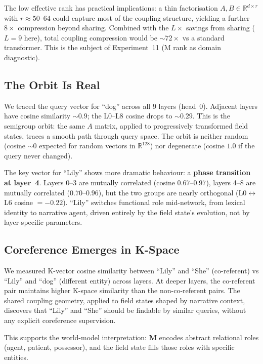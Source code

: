 \documentclass[11pt, a4paper]{article}
\newcommand{\M}{\mathbf{M}}
\newcommand{\R}{\mathbb{R}}
\theoremstyle{remark}
\begin{document}
The low effective rank has practical implications: a thin factorisation $A, B \in \R^{d \times r}$ with $r \approx 50$--$64$ could capture most of the coupling structure, yielding a further $8\times$ compression beyond sharing.
Combined with the $L\times$ savings from sharing ($L{=}9$ here), total coupling compression would be ${\sim}72\times$ vs a standard transformer.
This is the subject of Experiment~11 (M rank as domain diagnostic).

\subsection{The Orbit Is Real}

We traced the query vector for ``dog'' across all 9 layers (head~0).
Adjacent layers have cosine similarity ${\sim}0.9$; the L0--L8 cosine drops to ${\sim}0.29$.
This is the semigroup orbit: the same $A$ matrix, applied to progressively transformed field states, traces a smooth path through query space.
The orbit is neither random (cosine ${\sim}0$ expected for random vectors in $\R^{128}$) nor degenerate (cosine $1.0$ if the query never changed).

The key vector for ``Lily'' shows more dramatic behaviour: a \textbf{phase transition at layer~4}.
Layers 0--3 are mutually correlated (cosine $0.67$--$0.97$), layers 4--8 are mutually correlated ($0.70$--$0.96$), but the two groups are nearly orthogonal (L0$\leftrightarrow$L6 cosine $= -0.22$).
``Lily'' switches functional role mid-network, from lexical identity to narrative agent, driven entirely by the field state's evolution, not by layer-specific parameters.

\subsection{Coreference Emerges in K-Space}

We measured K-vector cosine similarity between ``Lily'' and ``She'' (co-referent) vs ``Lily'' and ``dog'' (different entity) across layers.
At deeper layers, the co-referent pair maintains higher K-space similarity than the non-co-referent pairs.
The shared coupling geometry, applied to field states shaped by narrative context, discovers that ``Lily'' and ``She'' should be findable by similar queries, without any explicit coreference supervision.

This supports the world-model interpretation: $\M$ encodes abstract relational roles (agent, patient, possessor), and the field state fills those roles with specific entities.
\end{document}
